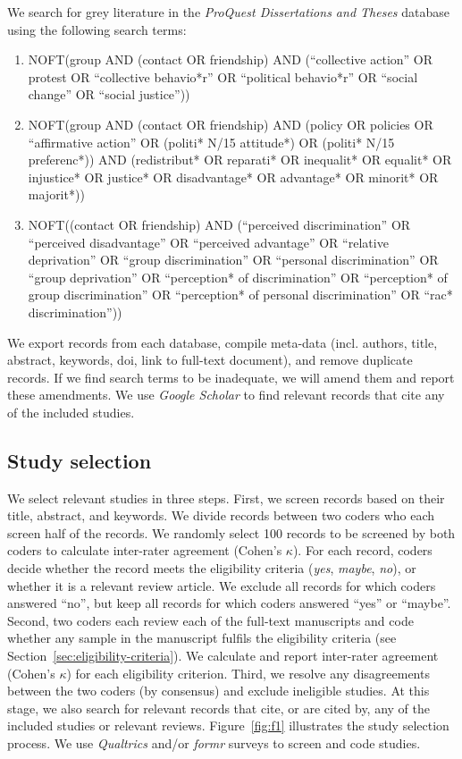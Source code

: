 \documentclass[10pt, a4paper]{article}
\begin{document}
\normalsize
We search for grey literature in the \emph{ProQuest Dissertations and Theses} database using the following search terms:
\small
\begin{enumerate}
\item NOFT(group AND (contact OR friendship) AND (``collective action'' OR protest OR ``collective behavio*r'' OR ``political behavio*r'' OR ``social change'' OR ``social justice''))
\item NOFT(group AND (contact OR friendship) AND (policy OR policies OR ``affirmative action'' OR (politi* N/15 attitude*) OR (politi* N/15 preferenc*)) AND (redistribut* OR reparati* OR inequalit* OR equalit* OR injustice* OR justice* OR disadvantage* OR advantage* OR minorit* OR majorit*))
\item NOFT((contact OR friendship) AND (``perceived discrimination'' OR ``perceived disadvantage'' OR ``perceived advantage'' OR ``relative deprivation'' OR ``group discrimination'' OR ``personal discrimination'' OR ``group deprivation'' OR ``perception* of discrimination'' OR ``perception* of group discrimination'' OR ``perception* of personal discrimination'' OR ``rac* discrimination''))
\end{enumerate}
\normalsize
We export records from each database, compile meta-data (incl. authors, title, abstract, keywords, doi, link to full-text document), and remove duplicate records. If we find search terms to be inadequate, we will amend them and report these amendments. We use \emph{Google Scholar} to find relevant records that cite any of the included studies. 

\subsection{Study selection}
\label{sec:study-selection}

We select relevant studies in three steps. First, we screen records based on their title, abstract, and keywords. We divide records between two coders who each screen half of the records. We randomly select 100 records to be screened by both coders to calculate inter-rater agreement (Cohen's $\kappa$). For each record, coders decide whether the record meets the eligibility criteria (\emph{yes}, \emph{maybe}, \emph{no}), or whether it is a relevant review article. We exclude all records for which coders answered ``no'', but keep all records for which coders answered ``yes'' or ``maybe''. Second, two coders each review each of the full-text manuscripts and code whether any sample in the manuscript fulfils the eligibility criteria (see Section~\ref{sec:eligibility-criteria}). We calculate and report inter-rater agreement (Cohen's $\kappa$) for each eligibility criterion. Third, we resolve any disagreements between the two coders (by consensus) and exclude ineligible studies. At this stage, we also search for relevant records that cite, or are cited by, any of the included studies or relevant reviews. Figure~\ref{fig:f1} illustrates the study selection process. We use \emph{Qualtrics} and/or \emph{formr} \cite{arslan_formr_2018} surveys to screen and code studies.
\end{document}
